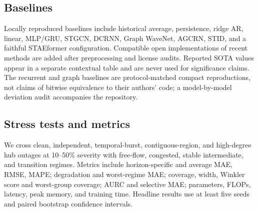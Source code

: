 \documentclass[pdflatex,sn-mathphys-num]{sn-jnl}
\begin{document}
\subsection{Baselines}
Locally reproduced baselines include historical average, persistence, ridge AR,
linear, MLP/GRU, STGCN, DCRNN, Graph WaveNet, AGCRN, STID, and a faithful
STAEformer configuration. Compatible open implementations of
recent methods are added after preprocessing and license audits. Reported SOTA
values appear in a separate contextual table and are never used for significance
claims. The recurrent and graph baselines are protocol-matched compact
reproductions, not claims of bitwise equivalence to their authors' code; a
model-by-model deviation audit accompanies the repository.
\begin{table}[t]
  \centering
  \caption{Literature-reported point accuracy for context only. Protocol and
  implementation differences prohibit direct significance comparisons with
  locally reproduced results.}
  \label{tab:reported-context}
\end{table}

\subsection{Stress tests and metrics}
We cross clean, independent, temporal-burst, contiguous-region, and high-degree
hub outages at 10--50\% severity with free-flow, congested, stable intermediate,
and transition regimes. Metrics include horizon-specific and average MAE, RMSE,
MAPE; degradation and worst-regime MAE; coverage, width, Winkler score and
worst-group coverage; AURC and selective MAE; parameters, FLOPs, latency, peak
memory, and training time. Headline results use at least five seeds and paired
bootstrap confidence intervals.
\end{document}
